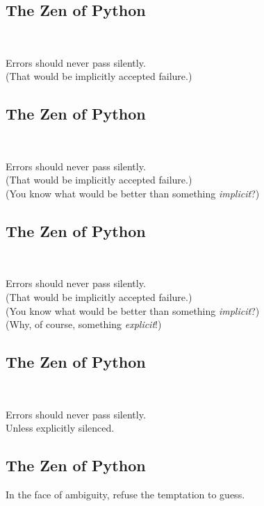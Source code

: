\documentclass[xga]{xdvislides}
\begin{document}
\subsection{The Zen of Python}
\\
\begin{center}
    Errors should never pass silently. \\
\addvspace{.2in}
	\small
	(That would be implicitly accepted failure.)
\end{center}
\Huge

\subsection{The Zen of Python}
\\
\begin{center}
    Errors should never pass silently. \\
\addvspace{.2in}
	\small
	(That would be implicitly accepted failure.) \\
\addvspace{.2in}
	(You know what would be better than something {\em implicit}?)
\end{center}

\subsection{The Zen of Python}
\\
\begin{center}
    Errors should never pass silently. \\
\addvspace{.2in}
	\small
	(That would be implicitly accepted failure.) \\
\addvspace{.2in}
	(You know what would be better than something {\em implicit}?) \\
\addvspace{.2in}
	(Why, of course, something {\em explicit}!)
\end{center}

\subsection{The Zen of Python}
\\
\begin{center}
    Errors should never pass silently. \\
\addvspace{.5in}
    Unless explicitly silenced.
\end{center}

\subsection{The Zen of Python}
\begin{center}
    In the face of ambiguity, refuse the temptation to guess.
\end{center}
\end{document}
